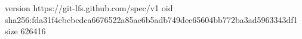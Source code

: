 version https://git-lfs.github.com/spec/v1
oid sha256:fda31f4cbcbcdca6676522a85ae6b5adb749dee65604bb772ba3ad5963343df1
size 626416

